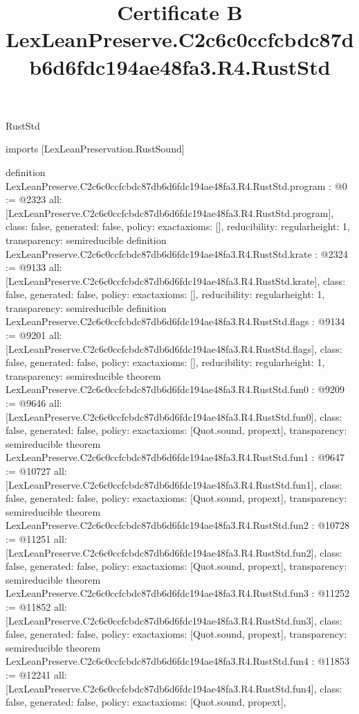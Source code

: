 \begin{lexlean}{RustStd}
\title{Certificate B LexLeanPreserve.C2c6c0ccfcbdc87db6d6fdc194ae48fa3.R4.RustStd}
\begin{coremodule}
imports [LexLeanPreservation.RustSound]

definition LexLeanPreserve.C2c6c0ccfcbdc87db6d6fdc194ae48fa3.R4.RustStd.program : @0 := @2323 {
  all: [LexLeanPreserve.C2c6c0ccfcbdc87db6d6fdc194ae48fa3.R4.RustStd.program],
  class: false,
  generated: false,
  policy: exact{axioms: []},
  reducibility: regular{height: 1},
  transparency: semireducible
}
definition LexLeanPreserve.C2c6c0ccfcbdc87db6d6fdc194ae48fa3.R4.RustStd.krate : @2324 := @9133 {
  all: [LexLeanPreserve.C2c6c0ccfcbdc87db6d6fdc194ae48fa3.R4.RustStd.krate],
  class: false,
  generated: false,
  policy: exact{axioms: []},
  reducibility: regular{height: 1},
  transparency: semireducible
}
definition LexLeanPreserve.C2c6c0ccfcbdc87db6d6fdc194ae48fa3.R4.RustStd.flags : @9134 := @9201 {
  all: [LexLeanPreserve.C2c6c0ccfcbdc87db6d6fdc194ae48fa3.R4.RustStd.flags],
  class: false,
  generated: false,
  policy: exact{axioms: []},
  reducibility: regular{height: 1},
  transparency: semireducible
}
theorem LexLeanPreserve.C2c6c0ccfcbdc87db6d6fdc194ae48fa3.R4.RustStd.fun0 : @9209 := @9646 {
  all: [LexLeanPreserve.C2c6c0ccfcbdc87db6d6fdc194ae48fa3.R4.RustStd.fun0],
  class: false,
  generated: false,
  policy: exact{axioms: [Quot.sound, propext]},
  transparency: semireducible
}
theorem LexLeanPreserve.C2c6c0ccfcbdc87db6d6fdc194ae48fa3.R4.RustStd.fun1 : @9647 := @10727 {
  all: [LexLeanPreserve.C2c6c0ccfcbdc87db6d6fdc194ae48fa3.R4.RustStd.fun1],
  class: false,
  generated: false,
  policy: exact{axioms: [Quot.sound, propext]},
  transparency: semireducible
}
theorem LexLeanPreserve.C2c6c0ccfcbdc87db6d6fdc194ae48fa3.R4.RustStd.fun2 : @10728 := @11251 {
  all: [LexLeanPreserve.C2c6c0ccfcbdc87db6d6fdc194ae48fa3.R4.RustStd.fun2],
  class: false,
  generated: false,
  policy: exact{axioms: [Quot.sound, propext]},
  transparency: semireducible
}
theorem LexLeanPreserve.C2c6c0ccfcbdc87db6d6fdc194ae48fa3.R4.RustStd.fun3 : @11252 := @11852 {
  all: [LexLeanPreserve.C2c6c0ccfcbdc87db6d6fdc194ae48fa3.R4.RustStd.fun3],
  class: false,
  generated: false,
  policy: exact{axioms: [Quot.sound, propext]},
  transparency: semireducible
}
theorem LexLeanPreserve.C2c6c0ccfcbdc87db6d6fdc194ae48fa3.R4.RustStd.fun4 : @11853 := @12241 {
  all: [LexLeanPreserve.C2c6c0ccfcbdc87db6d6fdc194ae48fa3.R4.RustStd.fun4],
  class: false,
  generated: false,
  policy: exact{axioms: [Quot.sound, propext]},
}
\end{coremodule}
\end{lexlean}
